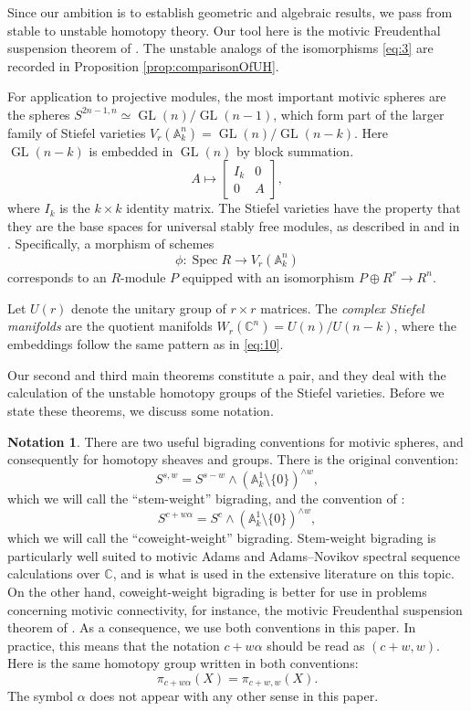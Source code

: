 \documentclass[11pt, oneside, dvipsnames, svgnames, table, final]{amsart}
\newcommand{\mathbx}[1]{\mathbb{#1}}
\theoremstyle{plain}
\theoremstyle{definition}
\newtheorem{notation}[thm]{Notation}
\theoremstyle{remark}
\newcommand{\C}{\mathbx{C}}
\newcommand{\A}{\mathbx{A}}
\newcommand{\Gl}{\operatorname{GL}}
\newcommand{\spec}{\operatorname{Spec}}
\newcommand{\Spec}{\spec}
\newcommand{\weq}{\simeq}
\newcommand{\GL}{\Gl}
\newcommand{\sm}{\setminus}
\newcommand{\<}[1]{{\langle}#1 {\rangle}}
\begin{document}
Since our ambition is to establish geometric and algebraic results, we pass from stable to unstable homotopy theory. Our tool here is the motivic Freudenthal suspension theorem of \cite{Asok2024}. The unstable analogs of the isomorphisms \eqref{eq:3} are recorded in Proposition \ref{prop:comparisonOfUH}.

For application to projective modules, the most important motivic spheres are the spheres $S^{2n-1,n} \weq \GL(n)/\GL(n-1)$, which form part of the larger family of Stiefel varieties $V_r(\A^n_k) = \GL(n)/\GL(n-k)$. Here $\GL(n-k)$ is embedded in $\GL(n)$ by block summation.
  \begin{equation}
    \label{eq:10}
    A \mapsto
    \begin{bmatrix}
      I_k & 0 \\ 0 & A
    \end{bmatrix},
  \end{equation}
where $I_k$ is the $k \times k$ identity matrix.
 The Stiefel varieties have the property that they are the base spaces for universal stably free modules, as described in \cite{Raynaud1968a} and in \cite[Sec.~3]{Gant2025}. Specifically, a morphism of schemes
\[ \phi:\Spec R \to V_r(\A_k^n) \]
corresponds to an $R$-module $P$ equipped with an isomorphism $P \oplus R^r \to R^n$. 

Let $U(r)$ denote the unitary group of $r \times r$ matrices. The \emph{complex Stiefel manifolds} are the quotient manifolds $W_r(\C^n) = U(n)/U(n-k)$, where the embeddings follow the same pattern as in \eqref{eq:10}.

Our second and third main theorems constitute a pair, and they deal with the calculation of the unstable homotopy groups of the Stiefel varieties. Before we state these theorems, we discuss some notation.
\begin{notation}
There are two useful bigrading conventions for motivic spheres, and consequently for homotopy sheaves and groups. There is the original convention:
\[ S^{s,w} = S^{s-w} \wedge (\A^1_k \sm \{0\})^{\wedge w}, \]
which we will call the ``stem-weight'' bigrading,
and the convention of \cite{Hu2011b}:
\[ S^{c+w\alpha} = S^c \wedge  (\A^1_k \sm \{0\})^{\wedge w}, \]
which we will call the ``coweight-weight'' bigrading.
Stem-weight bigrading is particularly well suited to motivic Adams and Adams--Novikov spectral sequence calculations over $\C$, and is what is used in the extensive literature on this topic. On the other hand, coweight-weight bigrading is better for use in problems concerning motivic connectivity, for instance, the motivic Freudenthal suspension theorem of \cite{Asok2024}. As a consequence, we use both conventions in this paper. In practice, this means that the notation $c+w\alpha$ should be read as $(c+w,w)$. Here is the same homotopy group written in both conventions:
\[ \pi_{c+w\alpha}(X) = \pi_{c+w,w}(X). \]
The symbol $\alpha$ does not appear with any other sense in this paper.
\end{notation}
\end{document}
